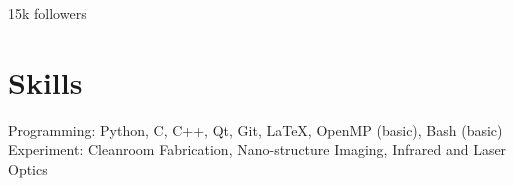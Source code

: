 \documentclass[11pt,letterpaper]{resume}
\begin{document}
15k followers

\section{Skills}
Programming: Python, C, C++, Qt, Git, \LaTeX, OpenMP (basic), Bash (basic)\\
Experiment: Cleanroom Fabrication, Nano-structure Imaging, 
Infrared and Laser Optics
\end{document}
